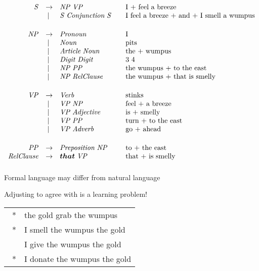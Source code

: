 \documentclass{article}
\begin{document}
\begin{huge}
\[ \begin{array}{rclcl}
\bnf{S} &\bnfeq& \bnf{NP}  \bl \bnf{VP}             && \mbox{I + feel a breeze }\\  
        & \bnfor & \bnf{S} \bl \bnf{Conjunction} \bl \bnf{S} && \mbox{I feel a
breeze + and + I smell a wumpus}\\[0.2in]
\bnf{NP} &\bnfeq& \bnf{Pronoun}                 && \mbox{I }\\
        & \bnfor & \bnf{Noun}                   && \mbox{pits }\\
        & \bnfor & \bnf{Article} \bl  \bnf{Noun}    && \mbox{the + wumpus }\\
	& \bnfor & \bnf{Digit}\bl  \bnf{Digit}	&& \mbox{3 4} \\
        & \bnfor & \bnf{NP} \bl  \bnf{PP}     && \mbox{the wumpus + to the east}\\
	& \bnfor & \bnf{NP} \bl \bnf{RelClause} && \mbox{the wumpus + that is smelly} \\[0.2in]
\bnf{VP} & \bnfeq & \bnf{Verb}                   && \mbox{stinks}\\
        & \bnfor & \bnf{VP} \bl  \bnf{NP}            && \mbox{feel + a breeze}\\
        & \bnfor & \bnf{VP} \bl  \bnf{Adjective}     && \mbox{is + smelly}\\
        & \bnfor & \bnf{VP} \bl  \bnf{PP}            && \mbox{turn + to the east}\\
        & \bnfor & \bnf{VP} \bl  \bnf{Adverb}        && \mbox{go + ahead}\\[0.2in]
\bnf{PP} & \bnfeq & \bnf{Preposition}  \bl \bnf{NP}  && \mbox{to + the east}\\
\rule[-9pt]{0pt}{10pt}\bnf{RelClause} & \bnfeq & \bnft{that} \bl \bnf{VP} &&\mbox{that + is smelly}\\
\end{array}\]




Formal language  may differ from natural language 

\vspace*{0.2in}

\textwidth
{}

Adjusting  to agree with  is a learning problem!

\begin{tabular}{ll}
  \ * & the gold grab the wumpus \\
  \ * & I smell the wumpus the gold \\
    & I give the wumpus the gold \\
  \ * & I donate the wumpus the gold
\end{tabular}


\end{huge}
\end{document}
